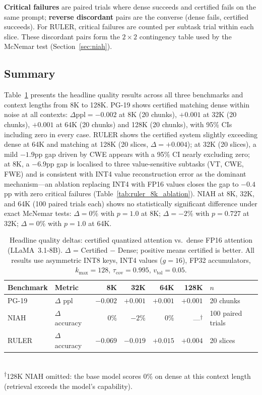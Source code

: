 \documentclass[10pt,twocolumn,a4paper]{article}
\theoremstyle{definition}
\theoremstyle{remark}
\begin{document}
\textbf{Critical failures} are paired trials where dense succeeds and certified fails on the same prompt; \textbf{reverse discordant} pairs are the converse (dense fails, certified succeeds).  For RULER, critical failures are counted per subtask trial within each slice.  These discordant pairs form the $2\times 2$ contingency table used by the McNemar test (Section~\ref{sec:niah}).

\subsection{Summary}

Table~\ref{tab:summary} presents the headline quality results across all three benchmarks and context lengths from 8K to 128K.  PG-19 shows certified matching dense within noise at all contexts: $\Delta\mathrm{ppl}{=}{-}0.002$ at 8K (20 chunks), $+0.001$ at 32K (20 chunks), $+0.001$ at 64K (20 chunks) and 128K (20 chunks), with 95\% CIs including zero in every case.  RULER shows the certified system slightly exceeding dense at 64K and matching at 128K (20 slices, $\Delta{=}{+}0.004$); at 32K (20 slices), a mild $-1.9$pp gap driven by CWE appears with a 95\% CI nearly excluding zero; at 8K, a $-6.9$pp gap is localised to three value-sensitive subtasks (VT, CWE, FWE) and is consistent with INT4 value reconstruction error as the dominant mechanism---an ablation replacing INT4 with FP16 values closes the gap to $-0.4$pp with zero critical failures (Table~\ref{tab:ruler_8k_ablation}).  NIAH at 8K, 32K, and 64K (100 paired trials each) shows no statistically significant difference under exact McNemar tests: $\Delta{=}0\%$ with $p{=}1.0$ at 8K; $\Delta{=}{-}2\%$ with $p{=}0.727$ at 32K; $\Delta{=}0\%$ with $p{=}1.0$ at 64K.

\begin{table}[!t]
\centering
\caption{Headline quality deltas: certified quantized attention vs.\ dense FP16 attention (LLaMA~3.1-8B).  $\Delta$ = Certified $-$ Dense; positive means certified is better.  All results use asymmetric INT8 keys, INT4 values ($g{=}16$), FP32 accumulators, $k_{\max}{=}128$, $\tau_{\mathrm{cov}}{=}0.995$, $v_{\mathrm{tol}}{=}0.05$.}
\label{tab:summary}
\small
\begin{tabular}{llrrrrl}
\toprule
\textbf{Benchmark} & \textbf{Metric} & \textbf{8K} & \textbf{32K} & \textbf{64K} & \textbf{128K} & \textbf{$n$} \\
\midrule
PG-19 & $\Delta$ ppl & $-0.002$ & $+0.001$ & $+0.001$ & $+0.001$ & 20 chunks \\
NIAH & $\Delta$ accuracy & $0\%$ & $-2\%$ & $0\%$ & ---\textsuperscript{$\dagger$} & 100 paired trials \\
RULER & $\Delta$ accuracy & $-0.069$ & $-0.019$ & $+0.015$ & $+0.004$ & 20 slices \\
\bottomrule
\end{tabular}
\\[2pt]
{\footnotesize \textsuperscript{$\dagger$}128K NIAH omitted: the base model scores 0\% on dense at this context length (retrieval exceeds the model's capability).}
\end{table}
\end{document}
